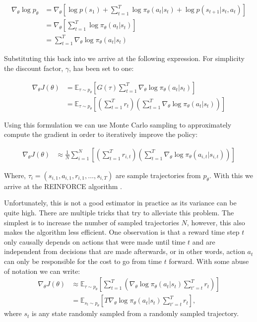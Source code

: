 \begin{align}
    \nabla_\theta \log p_\theta &= \nabla_\theta \left[ \log p(s_1) + \sum_{t=1}^T \log \pi_\theta(a_t|s_t) + \log p(s_{t+1} | s_t, a_t) \right]\\
    &= \nabla_\theta \left[ \sum_{t=1}^T \log \pi_\theta(a_t|s_t) \right]\\
    &= \sum_{t=1}^T \nabla_\theta \log \pi_\theta(a_t|s_t)
\end{align}

Substituting this back into  we arrive at the following expression. For simplicity the discount factor, $\gamma$, has been set to one:

\begin{align}
    \nabla_\theta J(\theta) &= \mathbb{E}_{\tau \sim p_\theta} \left[ G(\tau) \sum_{t=1}^T \nabla_\theta \log \pi_\theta(a_t|s_t) \right]\\
    &= \mathbb{E}_{\tau \sim p_\theta} \left[ \left( \sum_{t=1}^T r_t \right) \left( \sum_{t=1}^T \nabla_\theta \log \pi_\theta(a_t|s_t) \right) \right]
\end{align}

Using this formulation we can use Monte Carlo sampling  to approximately compute the gradient in order to iteratively improve the policy:


\begin{align}
    \nabla_\theta J(\theta) &\approx \frac{1}{N} \sum_{i=1}^{N} \left[ \left( \sum_{t=1}^T r_{i,t} \right) \left( \sum_{t=1}^T \nabla_\theta \log \pi_\theta(a_{i,t}|s_{i,t}) \right) \right]
\end{align}

Where, $\tau_i = (s_{i,1}, a_{i,1}, r_{i,1}, \dots, s_{i,T})$ are sample trajectories from $p_\theta$. With this we arrive at the REINFORCE algorithm \cite{williams1992simple}.

Unfortunately, this is not a good estimator in practice as its variance can be quite high. There are multiple tricks that try to alleviate this problem. The simplest is to increase the number of sampled trajectories $N$, however, this also makes the algorithm less efficient. One observation is that a reward time step $t$ only causally depends on actions that were made until time $t$ and are independent from decisions that are made afterwards, or in other words, action $a_t$ can only be responsible for the cost to go from time $t$ forward. With some abuse of notation we can write:
\begin{align}
    \nabla_\theta J(\theta) &\approx \mathbb{E}_{\tau \sim p_\theta} \left[ \sum_{t=1}^T \left( \nabla_\theta \log \pi_\theta(a_t|s_t)  \sum_{t'=t}^T r_t \right) \right]\\
    &= \mathbb{E}_{s_t \sim p_\theta} \left[T \nabla_\theta \log \pi_\theta(a_t|s_t)  \sum_{t'=t}^T r_t \right],
\end{align}
where $s_t$ is any state randomly sampled from a randomly sampled trajectory.

